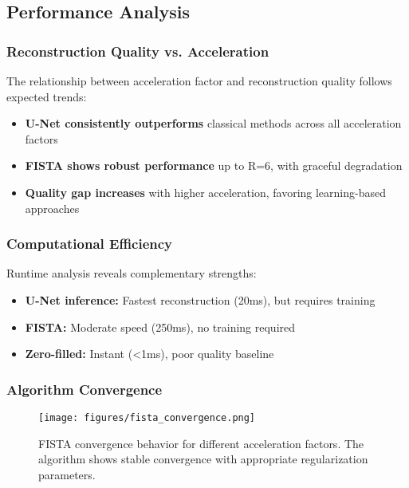 \documentclass[11pt,a4paper]{article}
\begin{document}
\subsection{Performance Analysis}

\subsubsection{Reconstruction Quality vs. Acceleration}

The relationship between acceleration factor and reconstruction quality follows expected trends:

\begin{itemize}
    \item \textbf{U-Net consistently outperforms} classical methods across all acceleration factors
    \item \textbf{FISTA shows robust performance} up to R=6, with graceful degradation
    \item \textbf{Quality gap increases} with higher acceleration, favoring learning-based approaches
\end{itemize}

\subsubsection{Computational Efficiency}

Runtime analysis reveals complementary strengths:

\begin{itemize}
    \item \textbf{U-Net inference:} Fastest reconstruction (20ms), but requires training
    \item \textbf{FISTA:} Moderate speed (250ms), no training required
    \item \textbf{Zero-filled:} Instant (<1ms), poor quality baseline
\end{itemize}

\subsubsection{Algorithm Convergence}

\begin{figure}[H]
    \centering
     \texttt{[image: figures/fista\_convergence.png]}
     \caption{FISTA convergence behavior for different acceleration factors. The algorithm shows stable convergence with appropriate regularization parameters.}
    \label{fig:fista_convergence}
\end{figure}
\end{document}
